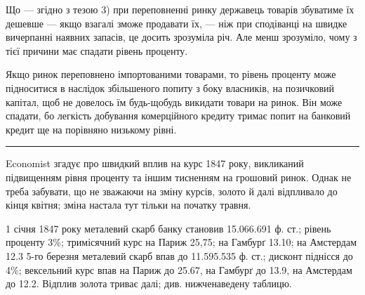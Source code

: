 
Що — згідно з тезою 3) при переповненні ринку державець товарів збуватиме
їх дешевше — якщо взагалі зможе продавати їх, — ніж при сподіванці на
швидке вичерпанні наявних запасів, це досить зрозуміла річ. Але менш зрозуміло,
чому з тієї причини має спадати рівень проценту.

Якщо ринок переповнено імпортованими товарами, то рівень проценту може
підноситися в наслідок збільшеного попиту з боку власників, на позичковий
капітал, щоб не довелось їм будь-щобудь викидати товари на ринок. Він може
спадати, бо легкість добування комерційного кредиту тримає попит на банковий
кредит ще на порівняно низькому рівні.

\pfbreak

Economist згадує про швидкий вплив на курс 1847 року, викликаний
підвищенням рівня проценту та іншим тисненням на грошовий ринок. Однак не
треба забувати, що не зважаючи на зміну курсів, золото й далі відпливало
до кінця квітня; зміна настала тут тільки на початку травня.

1 січня 1847 року металевий скарб банку становив \num{15.066.691} ф. ст.;
рівень проценту 3\%; тримісячний курс на Париж 25,75; на Гамбурґ 13.10;
на Амстердам 12.3 5-го березня металевий скарб впав до \num{11.595.535} ф. ст.;
дисконт піднісся до 4\%; вексельний курс впав на Париж до 25.67, на Гамбурґ
до 13.9, на Амстердам до 12.2. Відплив золота триває далі; див.
нижченаведену таблицю.

